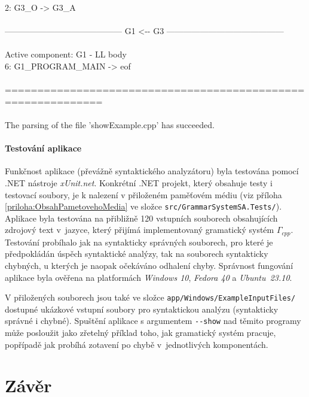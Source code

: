 \begin{priklad}
{    \phantom{mm}2: \phantom{mmmmmmmmmmmmmmm}                 G3\_O -> G3\_A \\
  \ \\
  ------------------------------------------    G1   <-\--   G3    ------------------------------------------ \\
  \ \\
  Active component: G1 - LL body \\
    \phantom{mm}6:\phantom{mmmmm}       G1\_PROGRAM\_MAIN -> eof \\
  \ \\
  ============================================================= \\
  \ \\
  The parsing of the file 'showExample.cpp' has succeeded.}

  \setlength{\parindent}{\defaultparindent}

\end{priklad}

\subsubsection*{Testování aplikace}
Funkčnost aplikace (převážně syntaktického analyzátoru) byla testována pomocí .NET nástroje \emph{xUnit.net}. Konkrétní .NET projekt,
který obsahuje testy i testovací soubory, je k nalezení v přiloženém paměťovém médiu (viz příloha \ref{priloha:ObsahPametovehoMedia} ve
složce \verb|src/GrammarSystemSA.Tests/|). Aplikace byla testována na přibližně 120 vstupních souborech obsahujících zdrojový text v~jazyce,
který přijímá implementovaný gramatický systém $\Gamma_{cpp}$. Testování probíhalo jak na syntakticky správných souborech, pro
které je předpokládán úspěch syntaktické analýzy, tak na souborech syntakticky chybných, u kterých je naopak očekáváno odhalení chyby.
Správnost fungování aplikace byla ověřena na platformách \emph{Windows 10}, \emph{Fedora 40} a \emph{Ubuntu~23.10}.

V přiložených souborech jsou také ve složce \texttt{app/Windows/ExampleInputFiles/} dostupné ukázkové vstupní soubory
pro syntaktickou analýzu (syntakticky správné i chybné). Spuštění aplikace s argumentem \texttt{-\--show} nad těmito programy může posloužit jako zřetelný příklad toho, jak
gramatický systém pracuje, popřípadě jak probíhá zotavení po chybě v~jednotlivých komponentách.

\chapter{Závěr}


